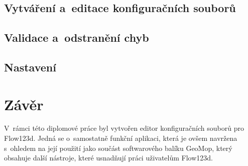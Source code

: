 \documentclass[FM,bw,DP]{tulthesis}
\begin{document}
\section{Vytváření a~editace konfiguračních souborů}

\section{Validace a~odstranění chyb}

\section{Nastavení} 



%
%
%
%
%
%
%
%
%
%
%
%
%
%


\chapter*{Závěr}
V~rámci této diplomové práce byl vytvořen editor konfiguračních souborů pro Flow123d. Jedná se o~samostatně funkční aplikaci, která je ovšem navržena s~ohledem na její použití jako součást softwarového balíku GeoMop, který obsahuje další nástroje, které usnadňují práci uživatelům Flow123d.
\end{document}
